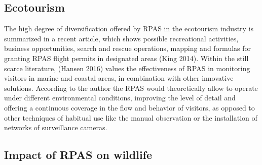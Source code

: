 \documentclass[]{interact}
\theoremstyle{plain}%
\theoremstyle{definition}
\theoremstyle{remark}
\begin{document}
\subsection{Ecotourism}\label{ecotourism}

The high degree of diversification offered by RPAS in the ecotourism
industry is summarized in a recent article, which shows possible
recreational activities, business opportunities, search and rescue
operations, mapping and formulas for granting RPAS flight permits in
designated areas (King 2014). Within the still scarce literature,
(Hansen 2016) values the effectiveness of RPAS in monitoring visitors in
marine and coastal areas, in combination with other innovative
solutions. According to the author the RPAS would theoretically allow to
operate under different environmental conditions, improving the level of
detail and offering a continuous coverage in the flow and behavior of
visitors, as opposed to other techniques of habitual use like the manual
observation or the installation of networks of surveillance cameras.

\subsection{Impact of RPAS on
wildlife}\label{impact-of-rpas-on-wildlife}
\end{document}

